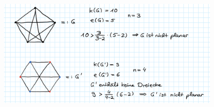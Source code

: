 \begin{solution}
\begin{enumerate}[label= (\alph*)]
\begin{figure}[H]
      \includegraphics[width=\linewidth]{assets/images/Abb1-15-12.png}
    \end{figure}
  \end{enumerate} 
\end{solution}

